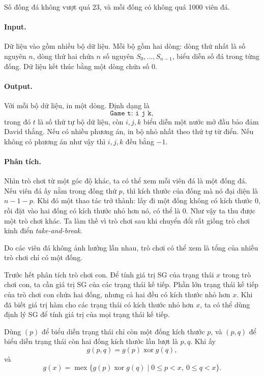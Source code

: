 \documentclass[11pt]{article}
\newcommand{\mex}{\operatorname{mex}}
\newcommand{\xor}{\mathbin{\operatorname{xor}}}
\begin{document}
Số đống đá không vượt quá 23, và mỗi đống có không quá 1000 viên đá.

\paragraph{Input.}
Dữ liệu vào gồm nhiều bộ dữ liệu. Mỗi bộ gồm hai dòng: dòng thứ nhất là số
nguyên \(n\), dòng thứ hai chứa \(n\) số nguyên \(S_0,\ldots,S_{n-1}\), biểu
diễn số đá trong từng đống. Dữ liệu kết thúc bằng một dòng chứa số 0.

\paragraph{Output.}
Với mỗi bộ dữ liệu, in một dòng. Định dạng là
\[
  \texttt{Game t: i j k},
\]
trong đó \(t\) là số thứ tự bộ dữ liệu, còn \(i,j,k\) biểu diễn một nước mở đầu
bảo đảm David thắng. Nếu có nhiều phương án, in bộ nhỏ nhất theo thứ tự từ điển.
Nếu không có phương án như vậy thì \(i,j,k\) đều bằng \(-1\).

\paragraph{Phân tích.}
Nhìn trò chơi từ một góc độ khác, ta có thể xem mỗi viên đá là một đống đá. Nếu
viên đá ấy nằm trong đống thứ \(p\), thì kích thước của đống mà nó đại diện là
\(n-1-p\). Khi đó một thao tác trở thành: lấy đi một đống không có kích thước
0, rồi đặt vào hai đống có kích thước nhỏ hơn nó, có thể là 0. Như vậy ta thu
được một trò chơi khác. Ta làm thế vì trò chơi sau khi chuyển đổi rất giống
trò chơi kinh điển \emph{take-and-break}.

Do các viên đá không ảnh hưởng lẫn nhau, trò chơi có thể xem là tổng của nhiều
trò chơi chỉ có một đống.

Trước hết phân tích trò chơi con. Để tính giá trị SG của trạng thái \(x\) trong
trò chơi con, ta cần giá trị SG của các trạng thái kế tiếp. Phần lớn trạng thái
kế tiếp của trò chơi con chứa hai đống, nhưng cả hai đều có kích thước nhỏ hơn
\(x\). Khi đã biết giá trị hàm cho các trạng thái có kích thước nhỏ hơn \(x\),
ta có thể dùng định lý SG để tính giá trị của mọi trạng thái kế tiếp.

Dùng \((p)\) để biểu diễn trạng thái chỉ còn một đống kích thước \(p\), và
\((p,q)\) để biểu diễn trạng thái còn hai đống kích thước lần lượt là \(p,q\).
Khi ấy
\[
  g(p,q)=g(p)\xor g(q),
\]
và
\[
  g(x)=\mex\{g(p)\xor g(q)\mid 0\le p<x,\ 0\le q<x\}.
\]
\end{document}
